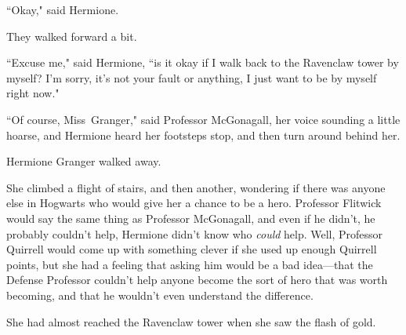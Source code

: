 ``Okay," said Hermione.

They walked forward a bit.

``Excuse me," said Hermione, ``is it okay if I walk back to the Ravenclaw tower by myself? I'm sorry, it's not your fault or anything, I just want to be by myself right now."

``Of course, Miss~Granger," said Professor McGonagall, her voice sounding a little hoarse, and Hermione heard her footsteps stop, and then turn around behind her.

Hermione Granger walked away.

She climbed a flight of stairs, and then another, wondering if there was anyone else in Hogwarts who would give her a chance to be a hero. Professor Flitwick would say the same thing as Professor McGonagall, and even if he didn't, he probably couldn't help, Hermione didn't know who \emph{could} help. Well, Professor Quirrell would come up with something clever if she used up enough Quirrell points, but she had a feeling that asking him would be a bad idea---that the Defense Professor couldn't help anyone become the sort of hero that was worth becoming, and that he wouldn't even understand the difference.

She had almost reached the Ravenclaw tower when she saw the flash of gold.

